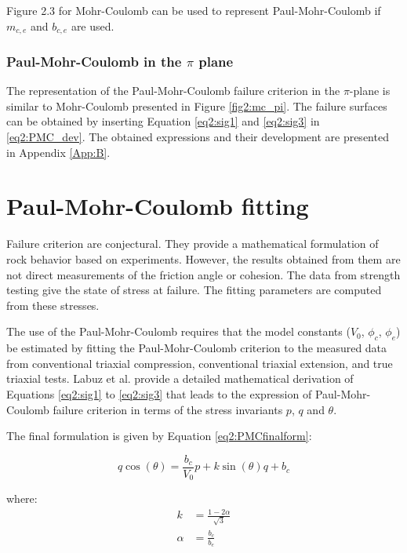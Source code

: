 Figure 2.3 for Mohr-Coulomb can be used to represent Paul-Mohr-Coulomb if $m_{c,e}$ and $b_{c,e}$ are used.

\subsubsection{Paul-Mohr-Coulomb in the \texorpdfstring{$\pi$}{pi} plane}\label{ch2:PMC_pi}

The representation of the Paul-Mohr-Coulomb failure criterion in the $\pi$-plane is similar to Mohr-Coulomb presented in Figure \ref{fig2:mc_pi}. The failure surfaces can be obtained by inserting Equation \ref{eq2:sig1} and \ref{eq2:sig3} in \ref{eq2:PMC_dev}. The obtained expressions and their development are presented in Appendix \ref{App:B}. 

\section{Paul-Mohr-Coulomb fitting }\label{ch2:pmcfit}

Failure criterion are conjectural. They provide a mathematical formulation of rock behavior based on experiments. However, the results obtained from them are not direct measurements of the friction angle or cohesion. The data from strength testing give the state of stress at failure. The fitting parameters are computed from these stresses.

The use of the Paul-Mohr-Coulomb requires that the model constants ($V_0$, $\phi_c$, $\phi_e$) be estimated by fitting the Paul-Mohr-Coulomb criterion to the measured data from conventional triaxial compression, conventional triaxial extension, and true triaxial tests. Labuz et al. \cite{Labuz2018} provide a detailed mathematical derivation of Equations \ref{eq2:sig1} to \ref{eq2:sig3} that leads to the expression of Paul-Mohr-Coulomb failure criterion in terms of the stress invariants $p$, $q$ and $\theta$. 

The final formulation is given by Equation \ref{eq2:PMCfinalform}:

\begin{equation}\label{eq2:PMCfinalform}
    q\cos(\theta) = \frac{b_c}{V_0}p+k\sin(\theta)q+b_c
\end{equation}

where:
\begin{align}
    k &= \frac{1-2\alpha }{\sqrt{3}}\\
    \alpha &= \frac{b_c}{b_e}
\end{align}


